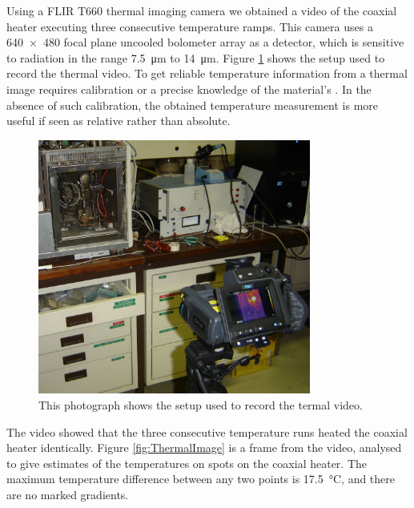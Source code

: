 Using a FLIR{\texttrademark} T660 thermal imaging camera we obtained a video of
the coaxial heater executing three consecutive temperature ramps. This camera
uses a \num{640 x 480} focal plane uncooled bolometer array as a detector, which
is sensitive to radiation in the range \SI{7.5}{\micro\metre} to
\SI{14}{\micro\metre}. Figure \ref{fig:ThermalImageSetup} shows the setup used
to record the thermal video. To get reliable temperature information from a
thermal image requires calibration or a precise knowledge of the material's
. In the absence of such calibration, the obtained
temperature measurement is more useful if seen as relative rather than absolute.

\begin{figure}
	\centering
	\includegraphics[width=0.8\textwidth]{Figures/ThermalImageSetup}
	\decoRule
	
\caption[A photograph of the setup used to record the thermal video]{This
photograph shows the setup used to record the termal video.}
	
	\label{fig:ThermalImageSetup}
\end{figure}

The video showed that the three consecutive temperature runs heated the coaxial
heater identically. Figure \ref{fig:ThermalImage} is a frame from the video,
analysed to give estimates of the temperatures on spots on the coaxial heater.
The maximum temperature difference between any two points is
\SI{17.5}{\celsius}, and there are no marked gradients.

